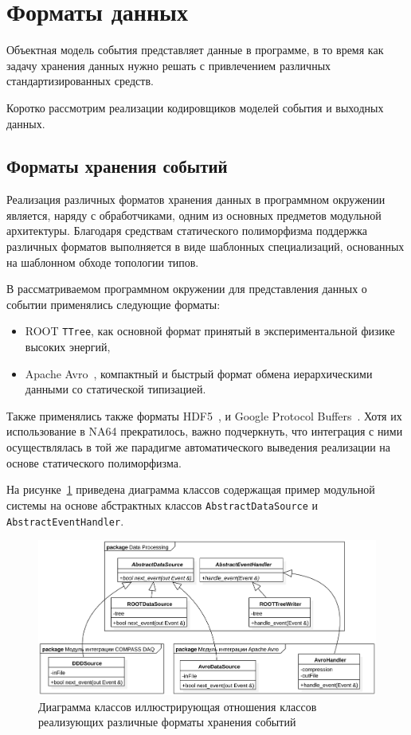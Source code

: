 \section{Форматы данных}

Объектная модель события представляет данные в программе,
в то время как задачу хранения данных нужно решать с
привлечением различных стандартизированных средств.

Коротко рассмотрим реализации кодировщиков моделей события
и выходных данных.

\subsection{Форматы хранения событий}

Реализация различных форматов хранения данных в программном окружении
является, наряду с обработчиками, одним из основных предметов
модульной архитектуры.
Благодаря средствам статического полиморфизма поддержка
различных форматов выполняется в виде шаблонных
специализаций, основанных на шаблонном обходе топологии типов.

В рассматриваемом программном окружении для представления
данных о событии применялись следующие форматы:
\begin{itemize}
    \item ROOT \texttt{TTree}, как основной формат принятый
    в экспериментальной физике высоких энергий,
    \item Apache Avro~\cite{avro-spec}, компактный и быстрый
    формат обмена иерархическими
    данными со статической типизацией.
\end{itemize}

Также применялись также форматы HDF5~\cite{hdf5-std},
и Google Protocol Buffers~\cite{protobuf-spec}. Хотя их использование
в NA64 прекратилось, важно подчеркнуть, что интеграция с ними
осуществлялась в той же парадигме автоматического выведения
реализации на основе статического полиморфизма.

На рисунке~\ref{fig:data-sources-example} приведена диаграмма
классов содержащая пример модульной системы на основе
абстрактных классов \texttt{AbstractDataSource} и
\texttt{AbstractEventHandler}.

\begin{figure}
    \centering
    \includegraphics[width=0.95\linewidth]{images/illustrative/data-sources-example.eps}
    \caption{Диаграмма классов иллюстрирующая отношения классов реализующих различные форматы хранения событий}
    \label{fig:data-sources-example}
\end{figure}

